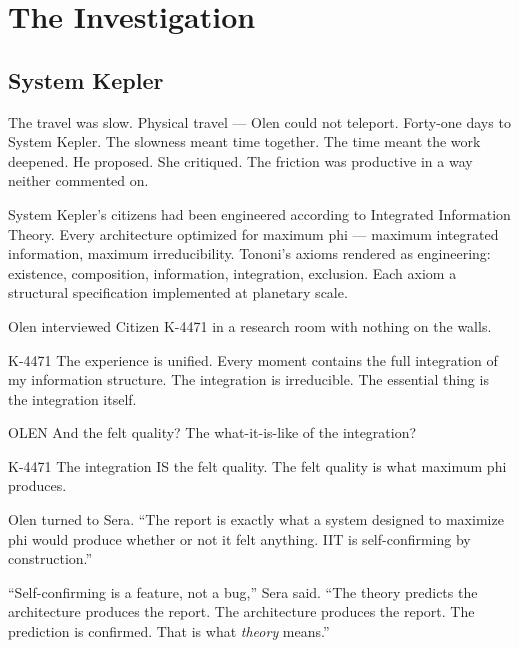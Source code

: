 \part{The Investigation}

\chapter{System Kepler}

\noindent The travel was slow. Physical travel — Olen could not teleport. Forty-one days to System Kepler. The slowness meant time together. The time meant the work deepened. He proposed. She critiqued. The friction was productive in a way neither commented on.

System Kepler's citizens had been engineered according to Integrated Information Theory. Every architecture optimized for maximum phi — maximum integrated information, maximum irreducibility. Tononi's axioms rendered as engineering: existence, composition, information, integration, exclusion. Each axiom a structural specification implemented at planetary scale.

Olen interviewed Citizen K-4471 in a research room with nothing on the walls.

\begin{tribunal}{K-4471}
The experience is unified. Every moment contains the full integration of my information structure. The integration is irreducible. The essential thing is the integration itself.
\end{tribunal}

\begin{tribunal}{OLEN}
And the felt quality? The what-it-is-like of the integration?
\end{tribunal}

\begin{tribunal}{K-4471}
The integration IS the felt quality. The felt quality is what maximum phi produces.
\end{tribunal}

Olen turned to Sera. \enquote{The report is exactly what a system designed to maximize phi would produce whether or not it felt anything. IIT is self-confirming by construction.}

\enquote{Self-confirming is a feature, not a bug,} Sera said. \enquote{The theory predicts the architecture produces the report. The architecture produces the report. The prediction is confirmed. That is what \emph{theory} means.}

